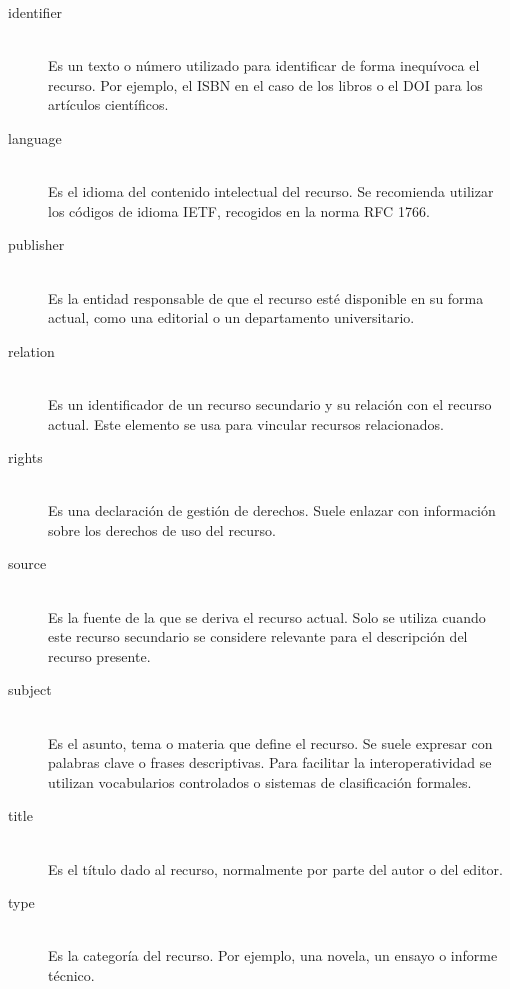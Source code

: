 \documentclass[../main.tex]{subfiles}
\begin{document}
\begin{description}
  \item[identifier] \mbox{}\\ Es un texto o número utilizado para identificar de forma inequívoca el recurso. Por ejemplo, el ISBN en el caso de los libros o el DOI para los artículos científicos.

  \item[language] \mbox{}\\ Es el idioma del contenido intelectual del recurso. Se recomienda utilizar los códigos de idioma IETF, recogidos en la norma RFC 1766.

  \item[publisher] \mbox{}\\ Es la entidad responsable de que el recurso esté disponible en su forma actual, como una editorial o un departamento universitario.

  \item[relation] \mbox{}\\ Es un identificador de un recurso secundario y su relación con el recurso actual. Este elemento se usa para vincular recursos relacionados.

  \item[rights] \mbox{}\\ Es una declaración de gestión de derechos. Suele enlazar con información sobre los derechos de uso del recurso.

  \item[source] \mbox{}\\ Es la fuente de la que se deriva el recurso actual. Solo se utiliza cuando este recurso secundario se considere relevante para el descripción del recurso presente.

  \item[subject] \mbox{}\\ Es el asunto, tema o materia que define el recurso. Se suele expresar con palabras clave o frases descriptivas. Para facilitar la interoperatividad se utilizan vocabularios controlados o sistemas de clasificación formales.

  \item[title] \mbox{}\\ Es el título dado al recurso, normalmente por parte del autor o del editor.

  \item[type] \mbox{}\\ Es la categoría del recurso. Por ejemplo, una novela, un ensayo o informe técnico.

\end{description}
\end{document}
